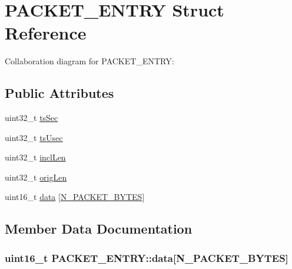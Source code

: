 \hypertarget{structPACKET__ENTRY}{}\section{P\+A\+C\+K\+E\+T\+\_\+\+E\+N\+T\+RY Struct Reference}
\label{structPACKET__ENTRY}


Collaboration diagram for P\+A\+C\+K\+E\+T\+\_\+\+E\+N\+T\+RY\+:
\subsection*{Public Attributes}
\begin{DoxyCompactItemize}
\item 
uint32\+\_\+t \hyperlink{structPACKET__ENTRY_abea31e5c174a03ab6359271d6f63a648}{ts\+Sec}
\item 
uint32\+\_\+t \hyperlink{structPACKET__ENTRY_a0c46e357bf2e2eec6d097408062f3cf1}{ts\+Usec}
\item 
uint32\+\_\+t \hyperlink{structPACKET__ENTRY_ae8dd8133096a6da388506261df58ff01}{incl\+Len}
\item 
uint32\+\_\+t \hyperlink{structPACKET__ENTRY_a2eb0d1882b86fd106ad82d3138273004}{orig\+Len}
\item 
uint16\+\_\+t \hyperlink{structPACKET__ENTRY_a44b794b18286d3bd159417ad67597e6f}{data} \mbox{[}\hyperlink{pcap-file-test-suite_8cc_afbd70e37403299f8c72166deb34c04c3}{N\+\_\+\+P\+A\+C\+K\+E\+T\+\_\+\+B\+Y\+T\+ES}\mbox{]}
\end{DoxyCompactItemize}


\subsection{Member Data Documentation}
\subsubsection[{\texorpdfstring{data}{data}}]{\setlength{\rightskip}{0pt plus 5cm}uint16\+\_\+t P\+A\+C\+K\+E\+T\+\_\+\+E\+N\+T\+R\+Y\+::data\mbox{[}{\bf N\+\_\+\+P\+A\+C\+K\+E\+T\+\_\+\+B\+Y\+T\+ES}\mbox{]}}\hypertarget{structPACKET__ENTRY_a44b794b18286d3bd159417ad67597e6f}{}\label{structPACKET__ENTRY_a44b794b18286d3bd159417ad67597e6f}
